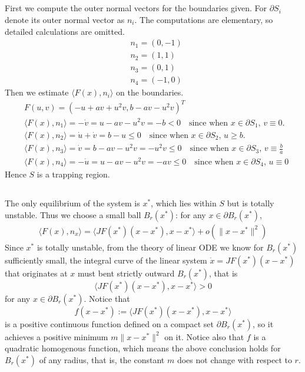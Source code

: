 \documentclass{article}
\begin{document}
\subsection{}
First we compute the outer normal vectors for the boundaries given. For $\partial S_i$ denote its outer normal vector as $n_i$. The computations are elementary, so detailed calculations are omitted.
\begin{align*}
	&n_1=(0,-1) \\
	&n_2=(1,1) \\
	&n_3=(0,1) \\
	&n_4=(-1,0)
\end{align*}
Then we estimate $\langle F(x),n_i \rangle$ on the boundaries.
\begin{align*}
	& F(u,v)=(-u+av+u^2v,b-av-u^2v)^T \\
	&\langle F(x),n_1\rangle =-\dot{v}=u-av-u^2v=-b<0 \quad\mbox{since when $x\in \partial S_1$, $v\equiv 0$.} \\
	&\langle F(x),n_2\rangle =\dot{u}+\dot{v}=b-u\leq0  \quad\mbox{since when $x\in\partial S_2$, $u\geq b$.} \\
	&\langle F(x),n_3\rangle =\dot{v}=b-av-u^2v=-u^2v\leq 0 \quad\mbox{since when $x\in \partial S_3$, $v\equiv \frac{b}{a}$} \\
	&\langle F(x),n_4\rangle=-\dot{u}=u-av-u^2v=-av\leq 0 \quad\mbox{since when $x\in\partial S_4$, $u\equiv 0$}
\end{align*}
Hence $S$ is a trapping region.

\subsection{}
The only equilibrium of the system is $x^*$, which lies within $S$ but is totally unstable. Thus we choose a small ball $B_r(x^*)$: for any $x\in \partial B_r(x^*)$,
\begin{align}\label{eq1}
	\langle F(x),n_x\rangle=\langle JF(x^*)(x-x^*),x-x^*\rangle+o(\lVert x-x^*\rVert^2)
\end{align}
Since $x^*$ is totally unstable, from the theory of linear ODE we know for $B_r(x^*)$ sufficiently small, the integral curve of the linear system $\dot{x}=JF(x^*)(x-x^*)$ that originates at $x$ must bent strictly outward $B_r(x^*)$, that is $$\langle JF(x^*)(x-x^*),x-x^*\rangle>0$$ for any $x\in\partial B_r(x^*)$. 
Notice that $$f(x-x^*):=\langle JF(x^*)(x-x^*),x-x^*\rangle$$ is a positive continuous function defined on a compact set $\partial B_r(x^*)$, so it achieves a positive minimum $m\lVert x-x^*\rVert^2$ on it. Notice also that $f$ is a quadratic homogenous function, which means the above conclusion holds for $B_r(x^*)$ of any radius, that is, the constant $m$ does not change with respect to $r$.
\end{document}
